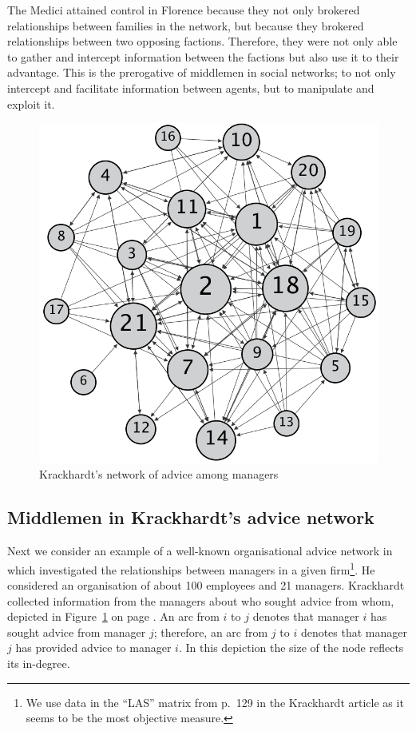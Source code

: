 \documentclass[11pt,fleqn]{article}
\begin{document}
\medskip\noindent The Medici attained control in Florence because they not only brokered relationships between families in the network, but because they brokered relationships between two opposing factions. Therefore, they were not only able to gather and intercept information between the factions but also use it to their advantage. This is the prerogative of middlemen in social networks; to not only intercept and facilitate information between agents, but to manipulate and exploit it.

\begin{figure}[t]
\centering
\includegraphics[scale=0.45]{Images/krack.png}
\caption{Krackhardt's network of advice among managers}
\label{krackhardtnetwork}
\end{figure}

\subsection{Middlemen in Krackhardt's advice network}

Next we consider an example of a well-known organisational advice network in which \citet{Krackhardt1987} investigated the relationships between managers in a given firm\footnote{We use data in the ``LAS'' matrix from p.~129 in the Krackhardt article as it seems to be the most objective measure.}. He considered an organisation of about 100 employees and 21 managers. Krackhardt collected information from the managers about who sought advice from whom, depicted in Figure~\ref{krackhardtnetwork} on page \pageref{krackhardtnetwork}. An arc from $i$ to $j$ denotes that manager $i$ has sought advice from manager $j$; therefore, an arc from $j$ to $i$ denotes that manager $j$ has provided advice to manager $i$. In this depiction the size of the node reflects its in-degree.
\end{document}
